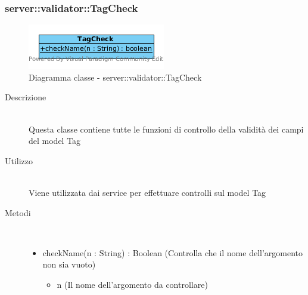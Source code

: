 \vspace{0.5cm}
\hypertarget{server::validator::TagCheck}{}
\subsubsection[TagCheck]{server::validator::TagCheck}
\begin{center}
			\begin{figure}[H]
				\centering \includegraphics[scale=4, max width=\textwidth, max height=\myheight]{../img/diagrammiClassi/server/validator/TagCheck.png}
				\caption{Diagramma classe - server::validator::TagCheck}
			\end{figure}
		\end{center}\begin{description}
\item[Descrizione] \hfill \\
 Questa classe contiene tutte le funzioni di controllo della validità dei campi del model Tag
\item[Utilizzo] \hfill \\
 Viene utilizzata dai service per effettuare controlli sul model Tag
\item[Metodi] \hfill \\
 \vspace{-7mm}
\begin{itemize}
\item checkName(n : String) : Boolean (Controlla che il nome dell'argomento non sia vuoto)\begin{itemize}
\item n (Il nome dell'argomento da controllare)
\end{itemize}

\end{itemize}

\end{description}

\vspace{0.5cm}
\hypertarget{server::validator::QuestionCheck}{}
